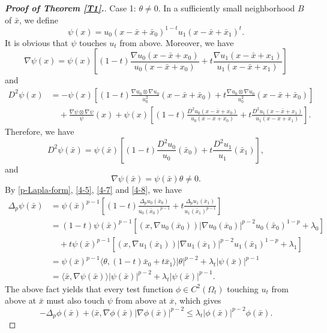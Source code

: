 \documentclass[12pt]{amsart}
\newcommand{\1}{\mathbf 1}
\begin{document}
\begin{proof}[\bf Proof of Theorem \ref{T1}.]
Case 1: $\theta\neq 0$.  In a sufficiently small neighborhood $B$ of $\bar{x}$, we define
\[
\psi(x)=u_0(x-\bar{x}+\bar{x}_0)^{1-t}u_1(x-\bar{x}+\bar{x}_1)^t.
\]
It is obvious that $\psi$ touches $u_t$ from above.
Moreover, we have
\[
\nabla \psi(x)=\psi(x)\left[ (1-t)\frac{\nabla u_0(x-\bar{x}+x_0)}{ u_0(x-\bar{x}+x_0)}+t\frac{\nabla u_1(x-\bar{x}+x_1)}{ u_1(x-\bar{x}+x_1)}\right]
\]
and
\begin{align*}
D^2 \psi(x)&=-\psi(x)\left[ (1-t)\frac{\nabla u_0 \otimes \nabla u_0}{u^2_0}(x-\bar{x}+\bar{x}_0)+t \frac{\nabla u_0 \otimes \nabla u_0}{u^2_0}(x-\bar{x}+\bar{x}_0)\right]\\
&\quad +\frac{\nabla \psi \otimes \nabla \psi}{\psi}(x)+ \psi(x)\left[ (1-t)\frac{D^2 u_0(x-\bar{x}+x_0)}{ u_0(x-\bar{x}+x_0)}+t\frac{D^2 u_1(x-\bar{x}+x_1)}{u_1(x-\bar{x}+x_1)}\right].
\end{align*}
Therefore, we have
\begin{equation}\label{4-7}
D^2 \psi (\bar{x})=\psi(\bar{x}) \left[ (1-t)\frac{D^2 u_0}{u_0}(\bar{x}_0)+t\frac{D^2 u_1}{u_1}(\bar{x}_1)\right],
\end{equation}
and
\begin{equation}\label{4-8}
\nabla \psi(\bar{x})=\psi(\bar{x})\theta\neq 0.
\end{equation}
By \eqref{p-Lapla-form}, \eqref{4-5}, \eqref{4-7} and \eqref{4-8}, we have
\begin{align*}
\Delta_p \psi(\bar{x})&= \psi(\bar{x})^{p-1}\left[ (1-t)\frac{\Delta_p u_0(\bar{x}_0)}{u_0(\bar{x}_0)^{p-1}}+t\frac{\Delta_p u_1(\bar{x}_1)}{u_1(\bar{x}_1)^{p-1}}\right] \\
&= (1-t)\psi(\bar{x})^{p-1}\left[(x,\nabla u_0(\overline{x}_0))|\nabla u_0(\overline{x}_0)|^{p-2}u_0(\bar{x}_0)^{1-p}+\lambda_0 \right]\\
&\quad +t\psi(\bar{x})^{p-1}\left[(x,\nabla u_1(\overline{x}_1))|\nabla u_1(\overline{x}_1)|^{p-2}u_1(\bar{x}_1)^{1-p}+\lambda_1 \right]\\
& =\psi(\bar{x})^{p-1}\langle \theta, (1-t)\bar{x}_0+t\bar{x}_1 \rangle |\theta|^{p-2} +\lambda_t|\psi(\bar{x})|^{p-1}\\
&=\langle \bar{x},\nabla \psi(\bar{x})\rangle | \psi(\bar{x})|^{p-2}+\lambda_t| \psi(\bar{x})|^{p-1}.
\end{align*}
The above fact yields that every test function $\phi\in C^2(\Omega_t)$ touching $u_t$ from above at $\bar{x}$ must also touch $\psi$ from above at $\overline{x}$, which gives
\begin{equation}\label{4-9}
-\Delta_p \phi(\bar{x})+(\bar{x},\nabla \phi(\bar{x})|\nabla \phi(\bar{x})|^{p-2}\leq \lambda_t| \phi(\bar{x})|^{p-2}\phi(\bar{x}).
\end{equation}


\end{proof}
\end{document}
